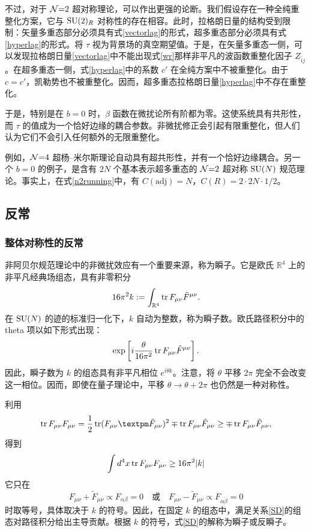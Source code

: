 不过，对于 $\mathcal{N}{=}2$ 超对称理论，可以作出更强的论断。我们假设存在一种全纯重整化方案，它与 $\mathop{\mathrm{SU}}(2)_R$ 对称性的存在相容。此时，拉格朗日量的结构受到限制：矢量多重态部分必须具有式\eqref{vectorlag}的形式，超多重态部分必须具有式\eqref{hyperlag}的形式。将 $\tau$ 视为背景场的真空期望值。于是，在矢量多重态一侧，可以发现拉格朗日量\eqref{vectorlag}中不能出现式\eqref{wr}那样非平凡的波函数重整化因子 $Z_{\bar ij}$。在超多重态一侧，式\eqref{hyperlag}中的系数 $c'$ 在全纯方案中不被重整化。由于 $c=c'$，凯勒势也不被重整化。因而，超多重态拉格朗日量\eqref{hyperlag}中不存在重整化。

于是，特别是在 $b=0$ 时，$\beta$ 函数在微扰论所有阶都为零。这使系统具有共形性，而 $\tau$ 的值成为一个恰好边缘的耦合参数。非微扰修正会引起有限重整化，但人们认为它们不会引入任何额外的无限重整化。

例如，$\mathcal{N}{=}4$ 超杨--米尔斯理论自动具有超共形性，并有一个恰好边缘耦合。另一个 $b=0$ 的例子，是含有 $2N$ 个基本表示超多重态的 $\mathcal{N}{=}2$ 超对称 $\mathop{\mathrm{SU}}(N)$ 规范理论。事实上，在式\eqref{n2running}中，有 $C(\text{adj})=N$，$C(R)=2\cdot2N\cdot1/2$。

\subsection{反常}
\subsubsection{整体对称性的反常}\label{sec:anomaly}
非阿贝尔规范理论中的非微扰效应有一个重要来源，称为瞬子。它是欧氏 $\mathbb{R}^4$ 上的非平凡经典场组态，具有非零积分
\begin{equation}
16\pi^2 k :=\int_{\mathbb{R}^4} \mathop{\mathrm{tr}}\nolimits F_{\mu\nu}\tilde F^{\mu\nu}.
\end{equation}
在 $\mathop{\mathrm{SU}}(N)$ 的迹的标准归一化下，$k$ 自动为整数，称为瞬子数。欧氏路径积分中的 theta 项以如下形式出现：
\begin{equation}
\exp\left[i\frac{\theta}{16\pi^2} \mathop{\mathrm{tr}}\nolimits F_{\mu\nu} \tilde F^{\mu\nu}\right].
\end{equation}
因此，瞬子数为 $k$ 的组态具有非平凡相位 $e^{i\theta k}$。注意，将 $\theta$ 平移 $2\pi$ 完全不会改变这一相位。因而，即使在量子理论中，平移 $\theta\to\theta+2\pi$ 也仍然是一种对称性。

利用
\begin{equation}
\tr F_{\mu\nu}F_{\mu\nu} = \frac12 \tr(F_{\mu\nu}\pm \tilde F_{\mu\nu})^2 \mp  \tr F_{\mu\nu} \tilde F_{\mu\nu}
\ge \mp \tr F_{\mu\nu}\tilde F_{\mu\nu},
\end{equation}
得到
\begin{equation}
\int d^4 x \mathop{\mathrm{tr}}\nolimits F_{\mu\nu} F_{\mu\nu} \ge 16\pi^2 |k| \label{bound}
\end{equation}
它只在
\begin{equation}
F_{\mu\nu} + \tilde F_{\mu\nu}\propto F_{\alpha\beta}=0 \quad
\text{或}
\quad F_{\mu\nu} - \tilde F_{\mu\nu}\propto F_{\dot\alpha\dot\beta}=0
\label{SD}
\end{equation}
时取等号，具体取决于 $k$ 的符号。因此，在固定 $k$ 的组态中，满足关系\eqref{SD}的组态对路径积分给出主导贡献。根据 $k$ 的符号，式\eqref{SD}的解称为瞬子或反瞬子。

